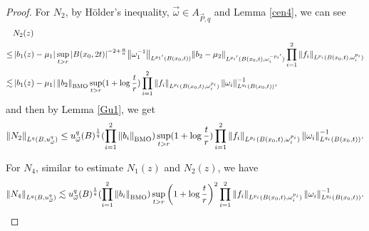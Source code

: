 \documentclass[11pt, twoside, leqno]{article}
\begin{document}
\begin{proof}[Proof]
	For ${N_2}$, by H\"older's inequality, $\vec{\omega} \in {A_{\vec P,q}}$ and Lemma \ref{cen4}, we can see 
	\begin{align*}
	&{N_2}(z)\notag\\
	\le&\left| {{b_1}(z) - {\mu _1}} \right|\mathop {\sup }\limits_{t > r} {\left| {B({x_0},2t)} \right|^{ - 2 + \frac{\alpha }{n}}}{\left\| {\omega _1^{ - 1}} \right\|_{{L^{{p_1}^\prime }}(B({x_0},t))}}{\left\| {{b_2} - {\mu _2}} \right\|_{{L^{{p_i}^\prime }}(B({x_0},t),\omega _i^{ - {p_i}^\prime })}}\prod\limits_{i = 1}^2 {{{\left\| {{f_i}} \right\|}_{{L^{{p_i}}}(B({x_0},t),\omega _i^{{p_i}})}}}\notag\\
	\lesssim&\left| {{b_1}(z) - {\mu _1}} \right|{\left\| {{b_2}} \right\|_{\rm BMO}}\mathop {\sup }\limits_{t > r} (1 + \log \frac{t}{r})\prod\limits_{i = 1}^2 {{{\left\| {{f_i}} \right\|}_{{L^{{p_i}}}(B({x_0},t),\omega _i^{{p_i}})}}\left\| {{\omega _i}} \right\|_{{L^{{q_i}}}(B({x_0},t))}^{ - 1}},
	\end{align*}
	and then by Lemma \ref{Gu1}, we get
	\begin{equation}
	{\left\| {{N_2}} \right\|_{{L^q}(B,u_{\vec \omega }^q)}} \le u_{\vec \omega }^q{(B)^{\frac{1}{q}}}(\prod\limits_{i = 1}^2 {{{\left\| {{b_i}} \right\|}_{\rm BMO}}} )\mathop {\sup }\limits_{t > r} (1 + \log \frac{t}{r})\prod\limits_{i = 1}^2 {{{\left\| {{f_i}} \right\|}_{{L^{{p_i}}}(B({x_0},t),\omega _i^{{p_i}})}}\left\| {{\omega _i}} \right\|_{{L^{{q_i}}}(B({x_0},t))}^{ - 1}}.
	\end{equation}
	
	For ${N_4}$, similar to estimate $N_{1}(z)$ and $N_{2}(z)$, we have
	\begin{equation}
	{\left\| {{N_4}} \right\|_{{L^q}(B,u_{\vec \omega }^q)}} \lesssim u_{\vec \omega }^q{(B)^{\frac{1}{q}}}(\prod\limits_{i = 1}^2 {{{\left\| {{b_i}} \right\|}_{\rm BMO}}} )\mathop {\sup }\limits_{t > r} {\left( {1 + \log \frac{t}{r}} \right)^2}\prod\limits_{i = 1}^2 {{{\left\| {{f_i}} \right\|}_{{L^{{p_i}}}(B({x_0},t),\omega _i^{{p_i}})}}\left\| {{\omega _i}} \right\|_{{L^{{q_i}}}(B({x_0},t))}^{ - 1}}.
	\end{equation}
	

\end{proof}
\end{document}
